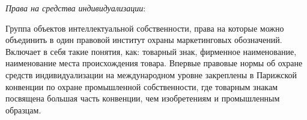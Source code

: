 \textit{Права на средства индивидуализации}:

Группа объектов интеллектуальной собственности, права на которые можно объединить в один правовой институт охраны маркетинговых обозначений. Включает в себя такие понятия, как: товарный знак, фирменное наименование, наименование места происхождения товара. Впервые правовые нормы об охране средств индивидуализации на международном уровне закреплены в Парижской конвенции по охране промышленной собственности, где товарным знакам посвящена большая часть конвенции, чем изобретениям и промышленным образцам.
\\
